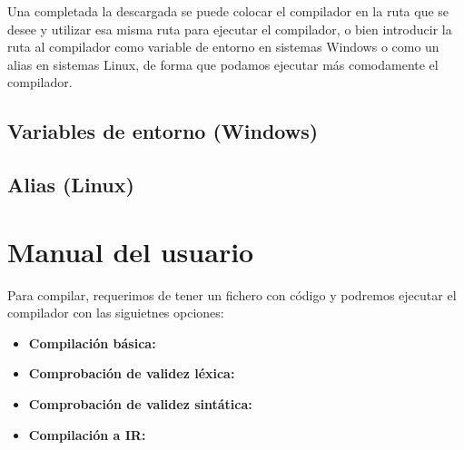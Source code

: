 Una completada la descargada se puede colocar el compilador en la ruta que se desee y utilizar esa misma ruta para ejecutar el compilador, o bien introducir la ruta al compilador como variable de entorno en sistemas Windows o como un alias en sistemas Linux, de forma que podamos ejecutar más comodamente el compilador.

\subsection{Variables de entorno (Windows)}

\subsection{Alias (Linux)}

\section{Manual del usuario}
Para compilar, requerimos de tener un fichero con código y podremos ejecutar el compilador con las siguietnes opciones:
\begin{itemize}
    \item \textbf{Compilación básica:}
    \item \textbf{Comprobación de validez léxica:}
    \item \textbf{Comprobación de validez sintática:}
    \item \textbf{Compilación a IR:} 
\end{itemize}